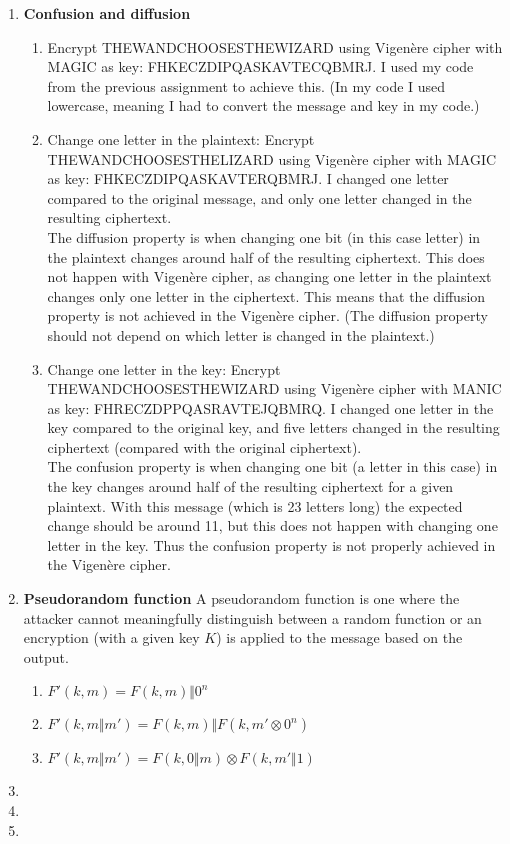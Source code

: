 \documentclass{article}
\begin{document}
	\homeworktitle
	
	\begin{enumerate}[label=\textbf{Task \arabic*:}]
		\item \textbf{Confusion and diffusion}
		\begin{enumerate}[label=\textit{Part \roman*:}]
			\item Encrypt \textsc{THEWANDCHOOSESTHEWIZARD} using Vigenère cipher with \textsc{MAGIC} as key: \textsc{FHKECZDIPQASKAVTECQBMRJ}. I used my code from the previous assignment to achieve this. (In my code I used lowercase, meaning I had to convert the message and key in my code.)
			
			\item Change one letter in the plaintext: Encrypt \textsc{THEWANDCHOOSESTHELIZARD} using Vigenère cipher with \textsc{MAGIC} as key: \textsc{FHKECZDIPQASKAVTERQBMRJ}. I changed one letter compared to the original message, and only one letter changed in the resulting ciphertext.\\
			The diffusion property is when changing one bit (in this case letter) in the plaintext changes around half of the resulting ciphertext. This does not happen with Vigenère cipher, as changing one letter in the plaintext changes only one letter in the ciphertext. This means that the diffusion property is not achieved in the Vigenère cipher. (The diffusion property should not depend on which letter is changed in the plaintext.)
			
			\item Change one letter in the key: Encrypt \textsc{THEWANDCHOOSESTHEWIZARD} using Vigenère cipher with \textsc{MANIC} as key: \textsc{FHRECZDPPQASRAVTEJQBMRQ}. I changed one letter in the key compared to the original key, and five letters changed in the resulting ciphertext (compared with the original ciphertext).\\
			The confusion property is when changing one bit (a letter in this case) in the key changes around half of the resulting ciphertext for a given plaintext. With this message (which is 23 letters long) the expected change should be around 11, but this does not happen with changing one letter in the key. Thus the confusion property is not properly achieved in the Vigenère cipher.	
		\end{enumerate}
		\item \textbf{Pseudorandom function}
		A pseudorandom function is one where the attacker cannot meaningfully distinguish between a random function or an encryption (with a given key $K$) is applied to the message based on the output.
		\begin{enumerate}[label=-]
			\item $ F'(k, m) = F(k, m) \Vert 0^n $
			\item $ F'(k, m \Vert m') = F(k, m) \Vert F(k, m' \otimes 0^n) $
			\item $ F'(k, m \Vert m') = F(k, 0 \Vert m) \otimes F(k, m' \Vert 1) $
		\end{enumerate}
		\item 
		\item 
		\item 
	\end{enumerate}
	
\end{document}
